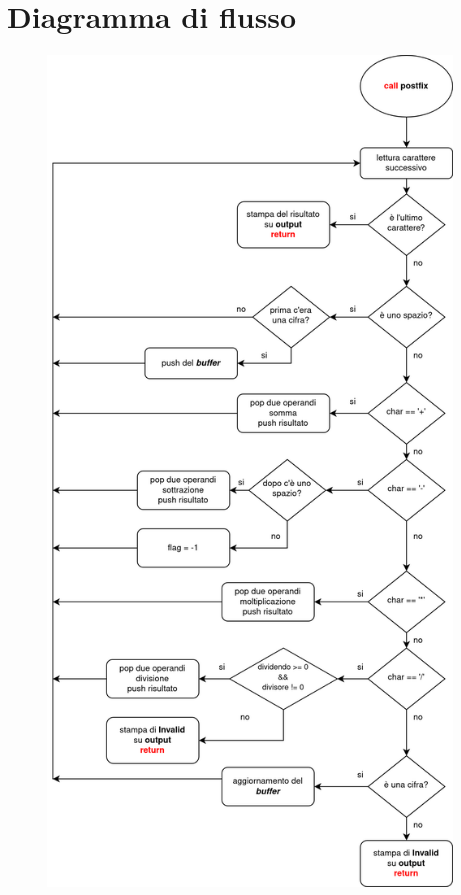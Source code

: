 \documentclass[a4paper,11pt,oneside]{book}
\begin{document}
\section{Diagramma di flusso}
\begin{figure}[hbt!]
  	\centering
	\includegraphics[height=22cm]{flowchart.png}
\end{figure}
\end{document}
